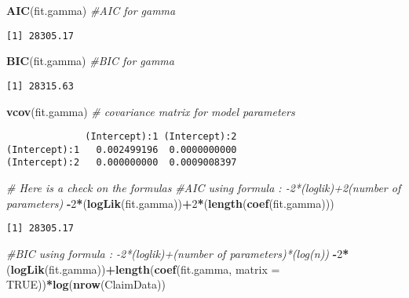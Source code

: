\documentclass[]{book}
\newenvironment{Shaded}{\begin{snugshade}}{\end{snugshade}}
\newcommand{\KeywordTok}[1]{\textcolor[rgb]{0.13,0.29,0.53}{\textbf{#1}}}
\newcommand{\DataTypeTok}[1]{\textcolor[rgb]{0.13,0.29,0.53}{#1}}
\newcommand{\DecValTok}[1]{\textcolor[rgb]{0.00,0.00,0.81}{#1}}
\newcommand{\CommentTok}[1]{\textcolor[rgb]{0.56,0.35,0.01}{\textit{#1}}}
\newcommand{\OtherTok}[1]{\textcolor[rgb]{0.56,0.35,0.01}{#1}}
\newcommand{\OperatorTok}[1]{\textcolor[rgb]{0.81,0.36,0.00}{\textbf{#1}}}
\newcommand{\NormalTok}[1]{#1}
\theoremstyle{definition}
\theoremstyle{definition}
\theoremstyle{definition}
\theoremstyle{remark}
\begin{document}
\begin{Shaded}
\begin{Highlighting}[]
\KeywordTok{AIC}\NormalTok{(fit.gamma)                  }\CommentTok{#AIC for gamma}
\end{Highlighting}
\end{Shaded}

\begin{verbatim}
[1] 28305.17
\end{verbatim}

\begin{Shaded}
\begin{Highlighting}[]
\KeywordTok{BIC}\NormalTok{(fit.gamma)                  }\CommentTok{#BIC for gamma}
\end{Highlighting}
\end{Shaded}

\begin{verbatim}
[1] 28315.63
\end{verbatim}

\begin{Shaded}
\begin{Highlighting}[]
\KeywordTok{vcov}\NormalTok{(fit.gamma)                 }\CommentTok{# covariance matrix for model parameters }
\end{Highlighting}
\end{Shaded}

\begin{verbatim}
              (Intercept):1 (Intercept):2
(Intercept):1   0.002499196  0.0000000000
(Intercept):2   0.000000000  0.0009008397
\end{verbatim}

\begin{Shaded}
\begin{Highlighting}[]
\CommentTok{# Here is a check on the formulas}
\CommentTok{#AIC using formula : -2*(loglik)+2(number of parameters)}
\OperatorTok{-}\DecValTok{2}\OperatorTok{*}\NormalTok{(}\KeywordTok{logLik}\NormalTok{(fit.gamma))}\OperatorTok{+}\DecValTok{2}\OperatorTok{*}\NormalTok{(}\KeywordTok{length}\NormalTok{(}\KeywordTok{coef}\NormalTok{(fit.gamma)))}
\end{Highlighting}
\end{Shaded}

\begin{verbatim}
[1] 28305.17
\end{verbatim}

\begin{Shaded}
\begin{Highlighting}[]
\CommentTok{#BIC using formula : -2*(loglik)+(number of parameters)*(log(n))}
\OperatorTok{-}\DecValTok{2}\OperatorTok{*}\NormalTok{(}\KeywordTok{logLik}\NormalTok{(fit.gamma))}\OperatorTok{+}\KeywordTok{length}\NormalTok{(}\KeywordTok{coef}\NormalTok{(fit.gamma, }\DataTypeTok{matrix =} \OtherTok{TRUE}\NormalTok{))}\OperatorTok{*}\KeywordTok{log}\NormalTok{(}\KeywordTok{nrow}\NormalTok{(ClaimData))}
\end{Highlighting}
\end{Shaded}
\end{document}
